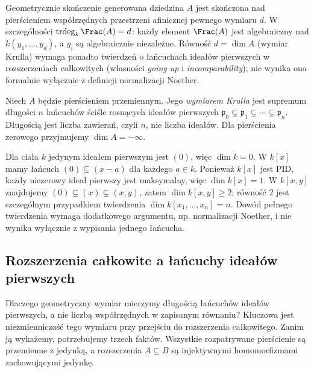 \begin{uwaga}
Geometrycznie skończenie generowana dziedzina
$A$ jest skończona nad pierścieniem współrzędnych
przestrzeni afinicznej pewnego wymiaru $d$.
W szczególności $\operatorname{trdeg}_k\Frac(A)=d$:
każdy element $\Frac(A)$ jest algebraiczny nad
$k(y_1,\ldots,y_d)$, a $y_i$ są algebraicznie
niezależne. Równość $d=\dim A$ (wymiar Krulla)
wymaga ponadto twierdzeń o łańcuchach ideałów
pierwszych w rozszerzeniach całkowitych
(własności \emph{going up} i \emph{incomparability});
nie wynika ona formalnie wyłącznie z definicji
normalizacji Noether.
\end{uwaga}


\begin{definicja}
Niech $A$ będzie pierścieniem przemiennym.
Jego \emph{wymiarem Krulla} jest supremum długości
$n$ łańcuchów ściśle rosnących ideałów pierwszych
$\mathfrak p_0\subsetneq\mathfrak p_1\subsetneq
\cdots\subsetneq\mathfrak p_n$. Długością jest
liczba zawierań, czyli $n$, nie liczba ideałów.
Dla pierścienia zerowego przyjmujemy $\dim A=-\infty$.
\end{definicja}

\begin{przyklad}
Dla ciała $k$ jedynym ideałem pierwszym jest $(0)$,
więc $\dim k=0$. W $k[x]$ mamy łańcuch
$(0)\subsetneq(x-a)$ dla każdego $a\in k$.
Ponieważ $k[x]$ jest PID, każdy niezerowy ideał
pierwszy jest maksymalny, więc $\dim k[x]=1$.
W $k[x,y]$ znajdujemy
$(0)\subsetneq(x)\subsetneq(x,y)$, zatem
$\dim k[x,y]\ge2$; równość $2$ jest szczególnym
przypadkiem twierdzenia $\dim k[x_1,\ldots,x_n]=n$.
Dowód pełnego twierdzenia wymaga dodatkowego
argumentu, np. normalizacji Noether, i nie wynika
wyłącznie z wypisania jednego łańcucha.
\end{przyklad}

\subsection{Rozszerzenia całkowite a łańcuchy ideałów pierwszych}
\label{subsec:going-up}
Dlaczego geometryczny wymiar mierzymy długością łańcuchów
ideałów pierwszych, a nie liczbą współrzędnych w
zapisanym równaniu? Kluczowa jest niezmienniczość
tego wymiaru przy przejściu do rozszerzenia
całkowitego. Zanim ją wykażemy, potrzebujemy
trzech faktów. Wszystkie rozpatrywane pierścienie
są przemienne z jedynką, a rozszerzenia $A\subseteq B$
są injektywnymi homomorfizmami zachowującymi jedynkę.

